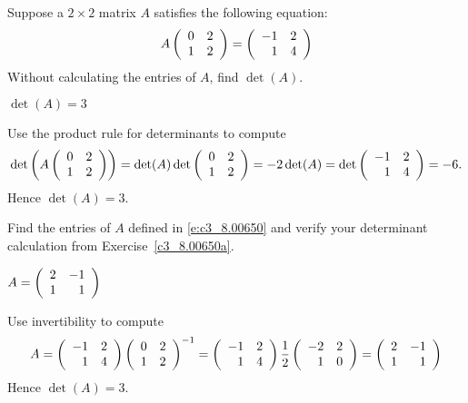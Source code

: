\documentclass{ximera}
\author{Martin Golubitsky}
\begin{document}
\begin{exercise}\label{c3_8.00650a}

Suppose a $2\times 2$ matrix $A$ satisfies the following equation:
\begin{equation} \label{e:c3_8.00650}
A \left(\begin{array}{rrrrrrrrrrrrrrrrrr}  0 & 2\\1 & 2 \end{array}\right) = \left(\begin{array}{rrrrrrrrrrrrrrrrrr}  -1 & 2\\ 1 & 4 \end{array}\right)
\end{equation}
Without calculating the entries of $A$, find $\det(A)$.
  
\begin{solution}

\ans $\det(A) = 3$  

\soln 
Use the product rule for determinants to compute
\[
\det \left(A \left(\begin{array}{rrrrrrrrrrrrrrrrrr}  0 & 2\\1 & 2 \end{array}\right)\right) = \det(A)\det \left(\begin{array}{rrrrrrrrrrrrrrrrrr}  0 & 2\\1 & 2 \end{array}\right) = -2\det(A) =
\det \left(\begin{array}{rrrrrrrrrrrrrrrrrr}  -1 & 2\\ 1 & 4 \end{array}\right) = -6.
\]
Hence  $\det(A) = 3$. 
\end{solution}
\end{exercise}

\begin{exercise}\label{c3_8.00650b}

Find the entries of $A$ defined in \eqref{e:c3_8.00650} and verify your determinant calculation from Exercise~\ref{c3_8.00650a}. 

  
\begin{solution}

\ans $A = \left(\begin{array}{rrrrrrrrrrrrrrrrrr} 2 & -1 \\ 1 & 1 \end{array}\right)$ 

\soln 
Use invertibility to compute
\[
A =  \left(\begin{array}{rrrrrrrrrrrrrrrrrr}  -1 & 2\\ 1 & 4 \end{array}\right)\left(\begin{array}{rrrrrrrrrrrrrrrrrr}  0 & 2\\1 & 2 \end{array}\right)^{-1} 
= \left(\begin{array}{rrrrrrrrrrrrrrrrrr}  -1 & 2\\ 1 & 4 \end{array}\right)\frac{1}{2}\left(\begin{array}{rrrrrrrrrrrrrrrrrr}  -2 & 2\\1 & 0 \end{array}\right)
= \left(\begin{array}{rrrrrrrrrrrrrrrrrr} 2 & -1 \\ 1 & 1 \end{array}\right)
\]
Hence $\det(A) = 3$.
\end{solution}
\end{exercise}
\end{document}
